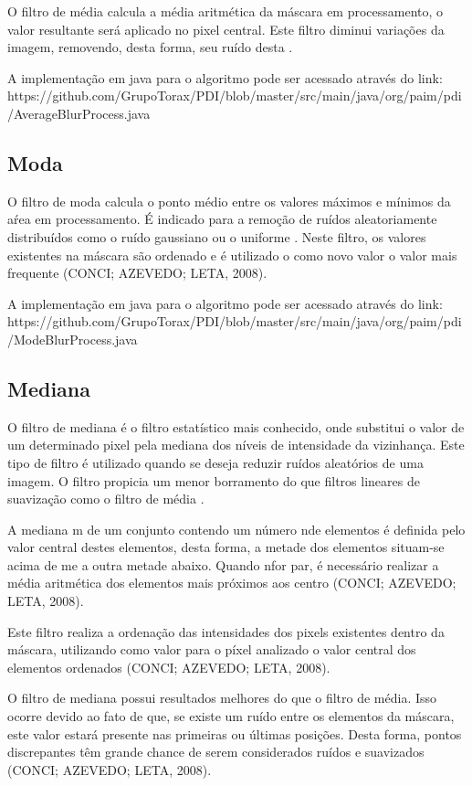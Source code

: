 \documentclass[
	12pt,				%
	oneside,			%
	a4paper,			%
	english,			%
	french,				%
	spanish,			%
	brazil,				%
	]{abntex2}
\begin{document}
O filtro de média calcula a média aritmética da máscara em processamento, o valor resultante será aplicado no pixel central. Este filtro diminui variações da imagem, removendo, desta forma, seu ruído desta \cite{gonzalesWoods:2008}.

A implementação em java para o algoritmo pode ser acessado através do link: https://github.com/GrupoTorax/PDI/blob/master/src/main/java/org/paim/pdi/AverageBlurProcess.java 

\subsection{Moda}
O filtro de moda calcula o ponto médio entre os valores máximos e mínimos da aŕea em processamento. É indicado para a remoção de ruídos aleatoriamente distribuídos como o ruído gaussiano ou o uniforme \cite{gonzalesWoods:2008}. Neste filtro, os valores existentes na máscara são ordenado e é utilizado o como novo valor o valor mais frequente (CONCI; AZEVEDO; LETA, 2008).

A implementação em java para o algoritmo pode ser acessado através do link:
https://github.com/GrupoTorax/PDI/blob/master/src/main/java/org/paim/pdi/ModeBlurProcess.java 

\subsection{Mediana}

 O filtro de mediana é o filtro estatístico mais conhecido, onde substitui o valor de um determinado pixel pela mediana dos níveis de intensidade da vizinhança. Este tipo de filtro é utilizado quando se deseja reduzir ruídos aleatórios de uma imagem. O filtro propicia um menor borramento do que filtros lineares de suavização como o filtro de média \cite{gonzalesWoods:2008}.

A mediana m de um conjunto contendo um número nde elementos é definida pelo valor central destes elementos, desta forma, a metade dos elementos situam-se acima de me a outra metade abaixo. Quando nfor par, é necessário realizar a média aritmética dos elementos mais próximos aos centro (CONCI; AZEVEDO; LETA, 2008).

Este filtro realiza a ordenação das intensidades dos pixels existentes dentro da máscara, utilizando como valor para o píxel analizado o valor central dos elementos ordenados (CONCI; AZEVEDO; LETA, 2008).

O filtro de mediana possui resultados melhores do que o filtro de média. Isso ocorre devido ao fato de que, se existe um ruído entre os elementos da máscara, este valor estará presente nas primeiras ou últimas posições. Desta forma, pontos discrepantes têm grande chance de serem considerados ruídos e suavizados (CONCI; AZEVEDO; LETA, 2008).
\end{document}
